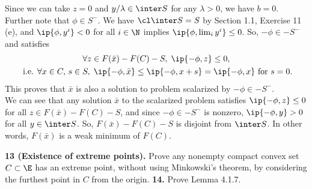 \documentclass[../borwein-lewis_notes.tex]{subfiles}
\begin{document}
\begin{enumerate}[(a),resume]
{Since we can take $z=0$ and $y/\lambda \in \inter S$ for any 
$\lambda > 0$, we have $b=0$. Further note that $\phi\in S^-$. 
We have $\cl\inter S = S$ by Section 1.1, Exercise 11 (e), and 
$\ip{\phi, y^i}<0$ for all $i\in \N$ implies $\ip{\phi, \lim_i y^i}
\leq 0$. So, $-\phi\in-S^-$ and satisfies 
\begin{gather*}
\forall z\in F(\bar x)-F(C)-S,\; \ip{-\phi, z}\leq 0, \\
\text{ i.e. } \forall x\in C,\,s\in S,\; 
\ip{-\phi, \bar x} \leq \ip{-\phi, x+s} = \ip{-\phi, x} 
\text{ for }s=0.
\end{gather*}
This proves that $\bar x$ is also a solution to problem scalarized 
by $-\phi\in-S^-$. \\
We can see that any solution $\bar x$ to the scalarized problem 
satisfies $\ip{-\phi, z} \leq 0$ for all $z\in F(\bar x)-F(C)-S$, 
and since $-\phi\in-S^-$ is nonzero, $\ip{-\phi, y} > 0$ for all
$y\in\inter S$. So, $F(\bar x)-F(C)-S$ is disjoint 
from $\inter S$. In other words, $F(\bar x)$ is a weak minimum of 
$F(C)$.
}
\end{enumerate}
\noindent
\textbf{13 (Existence of extreme points).} Prove any nonempty 
compact convex set $C\subset \E$ has an extreme point, without 
using Minkowski's theorem, by considering the furthest point in 
$C$ from the origin. 
\noindent
\textbf{14.} Prove Lemma 4.1.7. 
\end{document}
